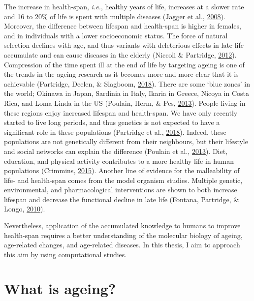 \documentclass[12pt,twoside]{unicam}
\begin{document}
The increase in health-span, \emph{i.e.}, healthy years of life, increases at a slower rate and 16 to 20\% of life is spent with multiple diseases (Jagger et al., \protect\hyperlink{ref-Jagger2008}{2008}). Moreover, the difference between lifespan and health-span is higher in females, and in individuals with a lower socioeconomic status. The force of natural selection declines with age, and thus variants with deleterious effects in late-life accumulate and can cause diseases in the elderly (Niccoli \& Partridge, \protect\hyperlink{ref-Niccoli2012}{2012}). Compression of the time spent ill at the end of life by targeting ageing is one of the trends in the ageing research as it becomes more and more clear that it is achievable (Partridge, Deelen, \& Slagboom, \protect\hyperlink{ref-Partridge2018}{2018}). There are some `blue zones' in the world; Okinawa in Japan, Sardinia in Italy, Ikaria in Greece, Nicoya in Costa Rica, and Loma Linda in the US (Poulain, Herm, \& Pes, \protect\hyperlink{ref-Poulain2013}{2013}). People living in these regions enjoy increased lifespan and health-span. We have only recently started to live long periods, and thus genetics is not expected to have a significant role in these populations (Partridge et al., \protect\hyperlink{ref-Partridge2018}{2018}). Indeed, these populations are not genetically different from their neighbours, but their lifestyle and social networks can explain the difference (Poulain et al., \protect\hyperlink{ref-Poulain2013}{2013}). Diet, education, and physical activity contributes to a more healthy life in human populations (Crimmins, \protect\hyperlink{ref-Crimmins2015}{2015}). Another line of evidence for the malleability of life- and health-span comes from the model organism studies. Multiple genetic, environmental, and pharmacological interventions are shown to both increase lifespan and decrease the functional decline in late life (Fontana, Partridge, \& Longo, \protect\hyperlink{ref-Fontana2010}{2010}).

Nevertheless, application of the accumulated knowledge to humans to improve health-span requires a better understanding of the molecular biology of ageing, age-related changes, and age-related diseases. In this thesis, I aim to approach this aim by using computational studies.

\hypertarget{introWhatAgeing}{%
\section{What is ageing?}\label{introWhatAgeing}}
\end{document}
